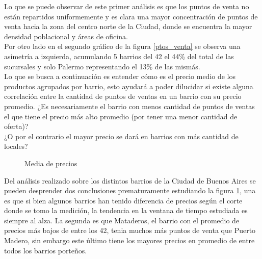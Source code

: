 Lo que se puede observar de este primer análisis es que los puntos de venta no están repartidos uniformemente y es clara una mayor concentración de puntos de venta hacia la zona del centro norte de la Ciudad, donde se encuentra la mayor densidad poblacional \cite{densidad} y áreas de oficina.\\
Por otro lado en el segundo gráfico de la figura \ref{ptos_venta} se observa una asimetría a izquierda, acumulando 5 barrios del 42 el 44\% del total de las sucursales y solo Palermo representando el 13\% de las mismás.\\
Lo que se busca a continuación es entender cómo es el precio medio de los productos agrupados por barrio, esto ayudará a poder dilucidar si existe alguna correlación entre la cantidad de puntos de ventas en un barrio con su precio promedio.
¿Es necesariamente el barrio con menos cantidad de puntos de ventas el que tiene el precio más alto promedio (por tener una menor cantidad de oferta)?\\
¿O por el contrario el mayor precio se dará en barrios con más cantidad de locales?\\

\newpage

\begin{figure}[h]
\centering
{}%
\caption{Media de precios}
\label{media_precios}
\end{figure}

Del análisis realizado sobre los distintos barrios de la Ciudad de Buenos Aires se pueden desprender dos conclusiones prematuramente estudiando la figura \ref{media_precios}, una es que si bien algunos barrios han tenido diferencia de precios según el corte donde se tomo la medición, la tendencia en la ventana de tiempo estudiada es siempre al alza. La segunda es que Mataderos, el barrio con el promedio de precios más bajos de entre los 42, tenia muchos más puntos de venta que Puerto Madero, sin embargo este último tiene los mayores precios en promedio de entre todos los barrios porteños. \\


